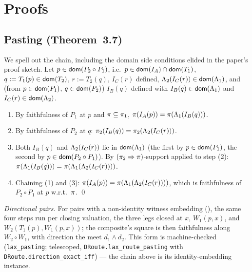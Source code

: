 
\section{Proofs}
\label{app:proofs}

\subsection{Pasting (Theorem~3.7)}

We spell out the chain, including the domain side conditions elided in
the paper's proof sketch. Let $p \in \mathsf{dom}(P_2 \circ P_1)$, i.e.\
$p \in \mathsf{dom}(I_A) \cap \mathsf{dom}(T_1)$, $q := T_1(p) \in \mathsf{dom}(T_2)$,
$r := T_2(q)$, $I_C(r)$ defined,
$\Lambda_2(I_C(r)) \in \mathsf{dom}(\Lambda_1)$, and (from $p \in \mathsf{dom}(P_1)$,
$q \in \mathsf{dom}(P_2)$) $I_B(q)$ defined with
$I_B(q) \in \mathsf{dom}(\Lambda_1)$ and $I_C(r) \in \mathsf{dom}(\Lambda_2)$.

\begin{enumerate}
\item By faithfulness of $P_1$ at $p$ and $\pi \subseteq \pi_1$,
  $\pi(I_A(p)) = \pi(\Lambda_1(I_B(q)))$.
\item By faithfulness of $P_2$ at $q$:
  $\pi_2(I_B(q)) = \pi_2(\Lambda_2(I_C(r)))$.
\item Both $I_B(q)$ and $\Lambda_2(I_C(r))$ lie in $\mathsf{dom}(\Lambda_1)$ (the
  first by $p \in \mathsf{dom}(P_1)$, the second by
  $p \in \mathsf{dom}(P_2 \circ P_1)$). By
  $(\pi_2 \Rightarrow \pi)$-support applied to step (2):
  $\pi(\Lambda_1(I_B(q))) = \pi(\Lambda_1(\Lambda_2(I_C(r))))$.
\item Chaining (1) and (3):
  $\pi(I_A(p)) = \pi(\Lambda_1(\Lambda_2(I_C(r))))$, which is
  faithfulness of $P_2 \circ P_1$ at $p$ w.r.t.\ $\pi$. \qed
\end{enumerate}

\emph{Directional pairs.} For pairs with a non-identity witness
embedding (), the same four steps run per closing
valuation, the three legs closed at $x$, $W_1(p,x)$, and
$W_2(T_1(p), W_1(p,x))$; the composite's square is then faithfulness
along $W_2 \circ W_1$, with direction the meet $d_1 \wedge d_2$. This
form is machine-checked (\texttt{lax\_pasting}; telescoped,
\texttt{DRoute.\allowbreak lax\_route\_pasting} with
\texttt{DRoute.\allowbreak direction\_exact\_iff}) --- the chain above
is its identity-embedding instance.

